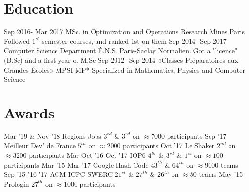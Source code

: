 \documentclass[letterpaper]{twentysecondcv} %
\newcommand\skills{ 
~
	\smartdiagram[bubble diagram]{
        \textbf{Algorithms},
        \textbf{Optimization},
        \textbf{Graph Theory},
        \textbf{Machine Learning}
    }
}
\begin{document}
\makeprofile %


      \hfill

    	\center


      \hfill
     
\section{Education}

\begin{twenty} %
	\twentyitem
    	{Sep 2016- Mar 2017}
        {MSc. in Optimization and Operations Research}
        {Mines Paris}
        {}
	{Followed $1^{st}$ semester courses, and ranked 1st on them}
	\twentyitem
    	{Sep 2014- Sep 2017}
        {Computer Science Department}
        {É.N.S. Paris-Saclay}
        {}
	{Normalien. Got a "licence" (B.Sc) and a first year of M.Sc}
	\twentyitem
    	{Sep 2012- Sep 2014}
        {«Classes Préparatoires aux Grandes Écoles»}
        {MPSI-MP*}
        {}
        {Specialized in Mathematics, Physics and Computer Science}
\end{twenty}


\section{Awards}
\begin{twentymedium}
   \twentyitemmedium
	{Mar '19 \& Nov '18}
	{Regions Jobs}
	{$3^{rd}$ \& $3^{rd}$ on $\approx 7000$ participants}
   \twentyitemmedium
    	{Sep '17}
	{Meilleur Dev' de France}
        {$5^{th}$ on $\approx 2000$ participants}
   \twentyitemmedium
    	{Oct '17}
	{Le Shaker}
        {$2^{nd}$ on $\approx 3200$ participants}
   \twentyitemmedium
	{Mar-Oct '16 Oct '17}
        {IOP6}
	{$4^{th}$ \& $3^{rd}$ \& $1^{st}$ on $\approx 100$ participants}
    \twentyitemmedium
    	{Mar '15 Mar '17}
        {Google Hash Code}
        {$43^{th}$ \& $64^{th}$ on $\approx 9000$ teams}
   \twentyitemmedium
	{Sep '15 '16 '17}
        {ACM-ICPC SWERC}
	{$21^{st}$  \& $27^{th}$ \& $26^{th}$ on $\approx 80$ teams}
   \twentyitemmedium
    	{May '15}
        {Prologin}
        {$27^{th}$ on $\approx 1000$ participants}
   
\end{twentymedium}
\end{document}
